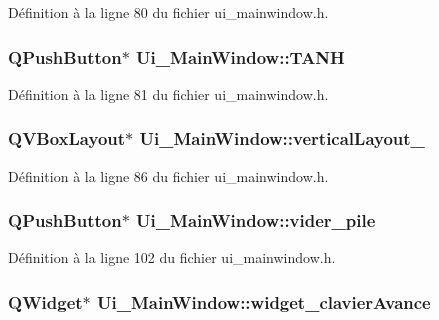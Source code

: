 \-Définition à la ligne 80 du fichier ui\-\_\-mainwindow.\-h.

\hypertarget{class_ui___main_window_aa0b74bbccda6715c999c78240332fda0}{
\subsubsection[{\-T\-A\-N\-H}]{\setlength{\rightskip}{0pt plus 5cm}\-Q\-Push\-Button$\ast$ {\bf \-Ui\-\_\-\-Main\-Window\-::\-T\-A\-N\-H}}}\label{class_ui___main_window_aa0b74bbccda6715c999c78240332fda0}


\-Définition à la ligne 81 du fichier ui\-\_\-mainwindow.\-h.

\hypertarget{class_ui___main_window_a0c01bad60d9f422a1258e710635a2f65}{
\subsubsection[{vertical\-Layout\-\_\-2}]{\setlength{\rightskip}{0pt plus 5cm}\-Q\-V\-Box\-Layout$\ast$ {\bf \-Ui\-\_\-\-Main\-Window\-::vertical\-Layout\-\_}}}\label{class_ui___main_window_a0c01bad60d9f422a1258e710635a2f65}


\-Définition à la ligne 86 du fichier ui\-\_\-mainwindow.\-h.

\hypertarget{class_ui___main_window_a48b51edf0d95abf4e0da82b6846d7c3d}{
\subsubsection[{vider\-\_\-pile}]{\setlength{\rightskip}{0pt plus 5cm}\-Q\-Push\-Button$\ast$ {\bf \-Ui\-\_\-\-Main\-Window\-::vider\-\_\-pile}}}\label{class_ui___main_window_a48b51edf0d95abf4e0da82b6846d7c3d}


\-Définition à la ligne 102 du fichier ui\-\_\-mainwindow.\-h.

\hypertarget{class_ui___main_window_afc376b376159bf114d26ad55b43e87b0}{
\subsubsection[{widget\-\_\-clavier\-Avance}]{\setlength{\rightskip}{0pt plus 5cm}\-Q\-Widget$\ast$ {\bf \-Ui\-\_\-\-Main\-Window\-::widget\-\_\-clavier\-Avance}}}\label{class_ui___main_window_afc376b376159bf114d26ad55b43e87b0}


